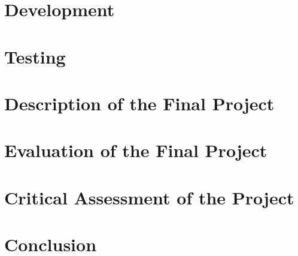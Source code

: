 \documentclass[a4paper, 11pt]{article}
\begin{document}
\section{Development}

\section{Testing}

\section{Description of the Final Project}

\section{Evaluation of the Final Project}

\section{Critical Assessment of the Project}

\section{Conclusion}



\end{document}
